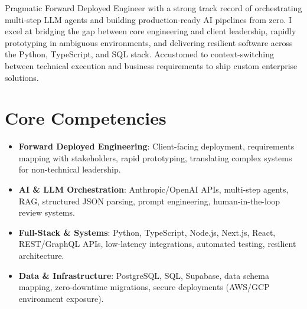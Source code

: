 \documentclass[11pt,a4paper,sans]{moderncv}
\begin{document}
\makecvtitle

Pragmatic Forward Deployed Engineer with a strong track record of orchestrating multi-step LLM agents and building production-ready AI pipelines from zero. I excel at bridging the gap between core engineering and client leadership, rapidly prototyping in ambiguous environments, and delivering resilient software across the Python, TypeScript, and SQL stack. Accustomed to context-switching between technical execution and business requirements to ship custom enterprise solutions.

\section{Core Competencies}
\begin{itemize}
\item \textbf{Forward Deployed Engineering}: Client-facing deployment, requirements mapping with stakeholders, rapid prototyping, translating complex systems for non-technical leadership.
\item \textbf{AI \& LLM Orchestration}: Anthropic/OpenAI APIs, multi-step agents, RAG, structured JSON parsing, prompt engineering, human-in-the-loop review systems.
\item \textbf{Full-Stack \& Systems}: Python, TypeScript, Node.js, Next.js, React, REST/GraphQL APIs, low-latency integrations, automated testing, resilient architecture.
\item \textbf{Data \& Infrastructure}: PostgreSQL, SQL, Supabase, data schema mapping, zero-downtime migrations, secure deployments (AWS/GCP environment exposure).
\end{itemize}

\vspace{3pt}
\end{document}
